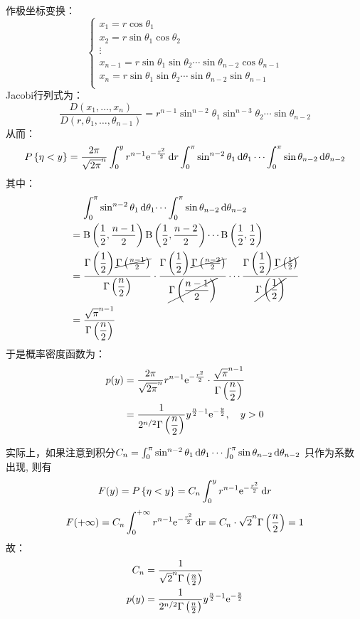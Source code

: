 作极坐标变换：
\[
    \begin{cases}
        x_{1} = r \cos \theta_{1} \\
        x_{2} = r \sin \theta_{1} \cos \theta_{2} \\
        \vdots\\
        x_{n-1} = r \sin \theta_{1} \sin \theta_{2} \cdots
        \sin\theta_{n-2} \cos\theta_{n-1}\\
        x_{n} = r \sin\theta_{1} \sin\theta_{2} \cdots
        \sin\theta_{n-2} \sin\theta_{n-1}\\
    \end{cases}
\]
Jacobi行列式为：
\[
    \frac{D(x_{1},\dots ,x_{n})}{D(r,\theta_{1},\dots,
    \theta_{n-1})} = r^{n-1} \sin^{n-2} \theta_{1}
    \sin^{n-3} \theta_{2} \cdots \sin\theta_{n-2}
\]
从而：
\[
    \P{\eta<y} = \frac{2\pi}{\sqrt{2\pi}^{n}}
    \int_{0}^{y} r^{n-1} \e^{-\frac{r^{2}}{2}} \d{r}
    \int_{0}^{\pi} \sin^{n-2} \theta_{1} \d{\theta_{1}} \cdots
    \int_{0}^{\pi} \sin\theta_{n-2} \d{\theta_{n-2}}
\]
其中：
\begin{align*}
    &\placeholder{=}\int_{0}^{\pi} \sin^{n-2} \theta_{1}
    \d{\theta_{1}} \dots
    \int_{0}^{\pi} \sin\theta_{n-2} \d{\theta_{n-2}}\\
    &= \betafunc{\frac{1}{2}}{\frac{n-1}{2}}
    \betafunc{\frac{1}{2}}{\frac{n-2}{2}} \cdots
    \betafunc{\frac{1}{2}}{\frac{1}{2}}\\
    &=
    \frac{\gammafunc{\dfrac{1}{2}}
    \cancel{\gammafunc{\frac{n-1}{2}}}}{\gammafunc{\dfrac{n}{2}}} \cdot
    \frac{\gammafunc{\dfrac{1}{2}}
    \cancel{\gammafunc{\frac{n-2}{2}}}}{\cancel{\gammafunc{\dfrac{n-1}{2}}}}
    \cdots
    \frac{\gammafunc{\dfrac{1}{2}}
    \cancel{\gammafunc{\frac{1}{2}}}}{\cancel{\gammafunc{\dfrac{1}{2}}}}\\
    &= \frac{\sqrt{\pi}^{n-1} }{\gammafunc{\dfrac{n}{2}}}
\end{align*}
于是概率密度函数为：
\begin{align*}
    p(y) &= \frac{2\pi}{\sqrt{2\pi}^{n}} r^{n-1} \mathrm{e}^{-\frac{r^{2}}{2}}
    \cdot \frac{\sqrt{\pi}^{n-1} }{\Gamma\left(\dfrac{n}{2}\right)}\\
    &= \frac{1}{2^{n/2} \Gamma\left(\dfrac{n}{2}\right)}
    y^{\frac{n}{2}-1} \mathrm{e}^{-\frac{y}{2}}, \quad y>0
\end{align*}

实际上，如果注意到积分\(C_{n}=\int_{0}^{\pi} \sin^{n-2} \theta_{1}
    \d{\theta_{1}} \cdots
\int_{0}^{\pi} \sin\theta_{n-2} \d{\theta_{n-2}}\)
只作为系数出现, 则有\[
    F(y)=\P{\eta<y} = C_{n} \int_{0}^{y} r^{n-1}
    \e^{-\frac{r^{2}}{2}} \d{r}
\]
\[
    F(+\infty) = C_{n} \int_{0}^{+\infty} r^{n-1}
    \e^{-\frac{r^{2}}{2}} \d{r} = C_{n} \cdot \sqrt{2}^{n}
    \gammafunc{\frac{n}{2}} = 1
\]
故：
\begin{align*}
    C_{n} &= \frac{1}{\sqrt{2}^{n} \Gamma\left(\frac{n}{2}\right)}\\
    p(y) &= \frac{1}{2^{n/2} \Gamma\left(\frac{n}{2}\right)} y^{\frac{n}{2}-1}
    \mathrm{e}^{-\frac{y}{2}}
\end{align*}

